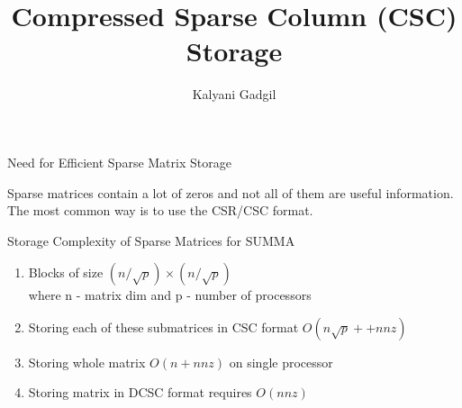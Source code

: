 \documentclass[12pt]{beamer}
\author{Kalyani Gadgil}
\title{Compressed Sparse Column (CSC) Storage }
\begin{document}
\newcommand\hl[1]{\tikz[overlay, remember picture,baseline=-\the\dimexpr\fontdimen22\textfont2\relax]\node[rectangle,fill=green!60,rounded corners,fill opacity = 0.2,draw,thick,text opacity =1] {$#1$};} 

\newcommand{\tikzmark}[2]{\tikz[overlay, remember picture] \node[inner sep=0pt, outer sep=0pt, anchor=base] (#1) {#2};}

 
\begin{frame}
\titlepage
\end{frame}

\begin{frame}{Need for Efficient Sparse Matrix Storage}
	\begin{center}
		Sparse matrices contain a lot of zeros and not all of them are useful information. The most common way is to use the CSR/CSC format.
		\end{center}
\end{frame}

\begin{frame}{Storage Complexity of Sparse Matrices for SUMMA}
	\begin{enumerate}
	\item Blocks of size $(n/\sqrt{p})\times (n/\sqrt{p})$ \\ where n - matrix dim and p - number of processors
	\item Storing each of these submatrices in CSC format $O(n\sqrt{p} ++ nnz)$
	\item Storing whole matrix $O(n + nnz)$ on single processor
	\item Storing matrix in DCSC format requires $O(nnz)$
\end{enumerate}		

\end{frame}
\end{document}
